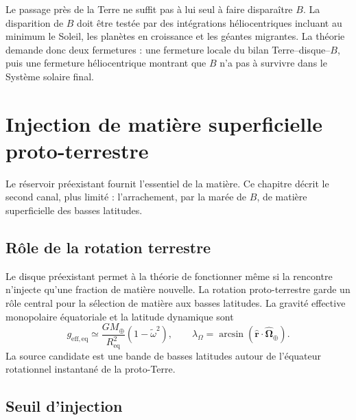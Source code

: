 \documentclass[11pt,a4paper,openany]{report}
\newcommand{\Mt}{M_{\oplus}}
\newcommand{\Req}{R_{\mathrm{eq}}}
\begin{document}
\begin{controle}
Le passage près de la Terre ne suffit pas à lui seul à faire disparaître $B$. La disparition de $B$
doit être testée par des intégrations héliocentriques incluant au minimum le Soleil, les planètes en
croissance et les géantes migrantes. La théorie demande donc deux fermetures : une fermeture
locale du bilan Terre--disque--$B$, puis une fermeture héliocentrique montrant que $B$ n'a pas à
survivre dans le Système solaire final.
\end{controle}


\chapter{Injection de matière superficielle proto-terrestre}
\label{ch:injection}

Le réservoir préexistant fournit l'essentiel de la matière. Ce chapitre décrit le second canal, plus
limité : l'arrachement, par la marée de $B$, de matière superficielle des basses latitudes.

\section{Rôle de la rotation terrestre}

Le disque préexistant permet à la théorie de fonctionner même si la rencontre n'injecte qu'une
fraction de matière nouvelle. La rotation proto-terrestre garde un rôle central pour la sélection
de matière aux basses latitudes. La gravité effective monopolaire équatoriale et la latitude
dynamique sont
\begin{equation}
g_{\mathrm{eff,eq}}\simeq\frac{G\Mt}{\Req^2}\left(1-\tilde\omega^2\right),
\qquad
\lambda_\Omega=\arcsin\!\left(\hat{\mathbf{r}}\cdot\hat{\boldsymbol{\Omega}}_\oplus\right).
\label{eq:geff}
\end{equation}
La source candidate est une bande de basses latitudes autour de l'équateur rotationnel
instantané de la proto-Terre.

\section{Seuil d'injection}
\end{document}
